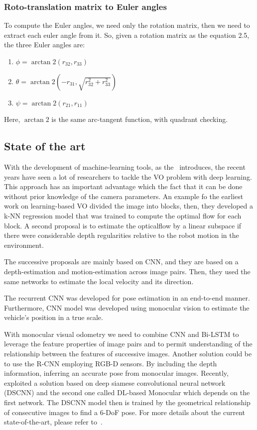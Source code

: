 \subsubsection*{Roto-translation matrix to Euler angles}
To compute the Euler angles, we need only the rotation matrix, then we need to extract each euler angle from it.
So, given a rotation matrix as the equation 2.5, the three Euler angles are:
\begin{enumerate}
    \item $\phi = \arctan2(r_{32}, r_{33})$
    \item $\theta = \arctan2(-r_{31}, \sqrt{r_{32}^2 + r_{33}^2})$
    \item $\psi = \arctan2(r_{21}, r_{11})$
\end{enumerate}
Here, $\arctan2$ is the same arc-tangent function, with quadrant checking.

\subsection{State of the art}\label{subsec:state-of-the-art}
With the development of machine-learning tools, as the~\cite{vo_state_of_art} introduces, the recent years have seen a lot of researchers to tackle the VO problem with deep learning.
This approach has an important advantage which the fact that it can be done without prior knowledge of the camera parameters.
An example fo the earliest work on learning-based VO divided the image into blocks, then, they developed a k-NN regression model that was trained to compute the optimal flow for each block.
A second proposal is to estimate the \gls{opticalflow} by a linear subspace if there were considerable depth regularities relative to the robot motion in the environment.

The successive proposals are mainly based on CNN, and they are based on a depth-estimation and motion-estimation across image pairs.
Then, they used the same networks to estimate the local velocity and its direction.

The recurrent CNN was developed for pose estimation in an end-to-end manner.
Furthermore, CNN model was developed using monocular vision to estimate the vehicle's position in a true scale.

With monocular visual odometry we need to combine CNN and Bi-LSTM to leverage the feature properties of image pairs and to permit understanding  of the relationship between the features of successive images.
Another solution could be to use the R-CNN employing RGB-D sensors.
By including the depth information, inferring an accurate pose from monocular images.
Recently, ~\cite{wang_vo} exploited a solution based on deep siamese convolutional neural network (DSCNN) and the second one called DL-based Monocular which depends on the first network.
The DSCNN model then is trained by the geometrical relationship of consecutive images to find a 6-DoF pose.
For more details about the current state-of-the-art, please refer to~\cite{vo_state_of_art}.

